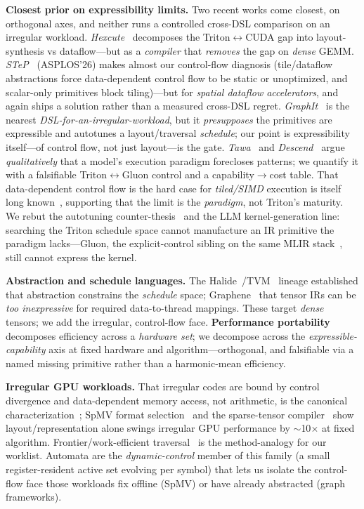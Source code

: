 \documentclass[conference]{IEEEtran}
\begin{document}
\textbf{Closest prior on expressibility limits.} Two recent works come closest, on orthogonal
axes, and neither runs a controlled cross-DSL comparison on an irregular workload.
\emph{Hexcute}~\cite{hexcute} decomposes the Triton$\leftrightarrow$CUDA gap into
layout-synthesis vs dataflow---but as a \emph{compiler} that \emph{removes} the gap on
\emph{dense} GEMM. \emph{STeP}~\cite{step} (ASPLOS'26) makes almost our control-flow diagnosis
(tile/dataflow abstractions force data-dependent control flow to be static or unoptimized, and
scalar-only primitives block tiling)---but for \emph{spatial dataflow accelerators}, and again
ships a solution rather than a measured cross-DSL regret. \emph{GraphIt}~\cite{graphit} is the
nearest \emph{DSL-for-an-irregular-workload}, but it \emph{presupposes} the primitives are
expressible and autotunes a layout/traversal \emph{schedule}; our point is expressibility
itself---of control flow, not just layout---is the gate. \emph{Tawa}~\cite{tawa} and
\emph{Descend}~\cite{descend} argue \emph{qualitatively} that a model's execution paradigm
forecloses patterns; we quantify it with a falsifiable Triton$\leftrightarrow$Gluon control and
a capability$\to$cost table. That data-dependent control flow is the hard case for
\emph{tiled/SIMD} execution is itself long known~\cite{cfemul}, supporting that the limit is
the \emph{paradigm}, not Triton's maturity. We rebut the autotuning counter-thesis~\cite{autotuning}
and the LLM kernel-generation line: searching the Triton schedule space cannot manufacture an IR
primitive the paradigm lacks---Gluon, the explicit-control sibling on the same MLIR
stack~\cite{triton}, still cannot express the kernel.

\textbf{Abstraction and schedule languages.} The Halide~\cite{halide}/TVM~\cite{tvm} lineage
established that abstraction constrains the \emph{schedule} space; Graphene~\cite{graphene}
that tensor IRs can be \emph{too inexpressive} for required data-to-thread mappings. These
target \emph{dense} tensors; we add the irregular, control-flow face. \textbf{Performance
portability}~\cite{pennycook} decomposes efficiency across a \emph{hardware set}; we decompose
across the \emph{expressible-capability} axis at fixed hardware and algorithm---orthogonal, and
falsifiable via a named missing primitive rather than a harmonic-mean efficiency.

\textbf{Irregular GPU workloads.} That irregular codes are bound by control divergence and
data-dependent memory access, not arithmetic, is the canonical
characterization~\cite{burtscher}; SpMV format selection~\cite{bestsf,sparsetir} and the
sparse-tensor compiler~\cite{taco} show layout/representation alone swings irregular GPU
performance by $\sim$10$\times$ at fixed algorithm. Frontier/work-efficient
traversal~\cite{merrill,gunrock} is the method-analogy for our worklist. Automata are the
\emph{dynamic-control} member of this family (a small register-resident active set evolving per
symbol) that lets us isolate the control-flow face those workloads fix offline (SpMV) or have
already abstracted (graph frameworks).
\end{document}
